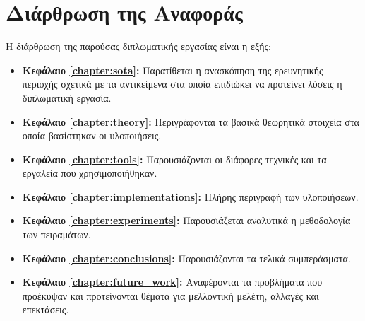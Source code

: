 \section{Διάρθρωση της Αναφοράς}
\label{section:layout}

Η διάρθρωση της παρούσας διπλωματικής εργασίας είναι η εξής:

\begin{itemize}
  \item{\textbf{Κεφάλαιο \ref{chapter:sota}:} Παρατίθεται η ανασκόπηση της ερευνητικής
      περιοχής σχετικά με τα αντικείμενα στα οποία επιδιώκει να
      προτείνει λύσεις η διπλωματική εργασία.
    }
  \item{\textbf{Κεφάλαιο \ref{chapter:theory}:} Περιγράφονται τα βασικά θεωρητικά στοιχεία
      στα οποία βασίστηκαν οι υλοποιήσεις.
    }
  \item{\textbf{Κεφάλαιο \ref{chapter:tools}:} Παρουσιάζονται οι
      διάφορες τεχνικές και τα εργαλεία που χρησιμοποιήθηκαν.
    }
  \item{\textbf{Κεφάλαιο \ref{chapter:implementations}:} Πλήρης περιγραφή των υλοποιήσεων.
    }
  \item{\textbf{Κεφάλαιο \ref{chapter:experiments}:} Παρουσιάζεται αναλυτικά η μεθοδολογία των
      πειραμάτων.
    }
  \item{\textbf{Κεφάλαιο \ref{chapter:conclusions}:} Παρουσιάζονται τα τελικά συμπεράσματα.
    }
  \item{\textbf{Κεφάλαιο \ref{chapter:future_work}:} Αναφέρονται τα
      προβλήματα που προέκυψαν και προτείνονται θέματα για μελλοντική
      μελέτη, αλλαγές και επεκτάσεις.
    }
\end{itemize}



